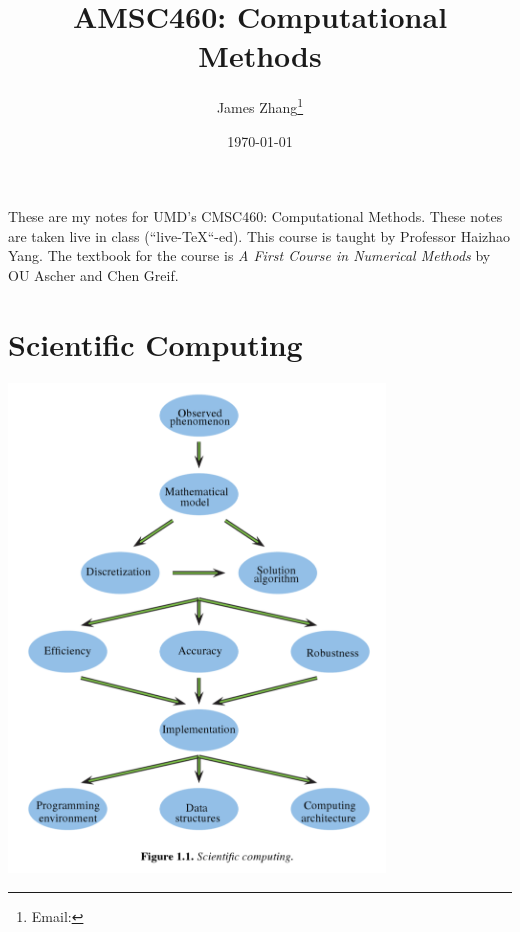 \documentclass[12pt]{scrartcl}
\begin{document}
\title{AMSC460: Computational Methods}
\author{James Zhang\thanks{Email: }}
\date{\today}




\maketitle
These are my notes for UMD's CMSC460: Computational Methods. These notes are taken live in class 
(``live-\TeX``-ed). This course is taught by Professor Haizhao Yang. The textbook for the course is 
\textit{A First Course in Numerical Methods} by OU Ascher and Chen Greif.
\tableofcontents

\newpage

\section{Scientific Computing}

\includegraphics[width=10cm]{scientific_compute.png}
\end{document}
